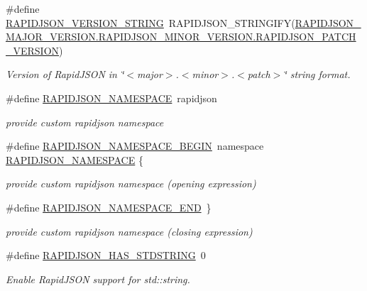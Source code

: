 \begin{DoxyCompactItemize}
\#define \hyperlink{group__RAPIDJSON__CONFIG_gad283cfde97d9a32b7d8e8107b11f70a6}{R\+A\+P\+I\+D\+J\+S\+O\+N\+\_\+\+V\+E\+R\+S\+I\+O\+N\+\_\+\+S\+T\+R\+I\+NG}~R\+A\+P\+I\+D\+J\+S\+O\+N\+\_\+\+S\+T\+R\+I\+N\+G\+I\+FY(\hyperlink{group__RAPIDJSON__CONFIG_gaf967d31be43666ce7f53756d73bd1cdf}{R\+A\+P\+I\+D\+J\+S\+O\+N\+\_\+\+M\+A\+J\+O\+R\+\_\+\+V\+E\+R\+S\+I\+O\+N.\+R\+A\+P\+I\+D\+J\+S\+O\+N\+\_\+\+M\+I\+N\+O\+R\+\_\+\+V\+E\+R\+S\+I\+O\+N.\+R\+A\+P\+I\+D\+J\+S\+O\+N\+\_\+\+P\+A\+T\+C\+H\+\_\+\+V\+E\+R\+S\+I\+ON})
\begin{DoxyCompactList}\small\item\em Version of Rapid\+J\+S\+ON in \char`\"{}$<$major$>$.$<$minor$>$.$<$patch$>$\char`\"{} string format. \end{DoxyCompactList}\item 
\#define \hyperlink{group__RAPIDJSON__CONFIG_ga743a79d3af927391fe3eb5c979136899}{R\+A\+P\+I\+D\+J\+S\+O\+N\+\_\+\+N\+A\+M\+E\+S\+P\+A\+CE}~rapidjson
\begin{DoxyCompactList}\small\item\em provide custom rapidjson namespace \end{DoxyCompactList}\item 
\#define \hyperlink{group__RAPIDJSON__CONFIG_gad3806c8251fdc7da9618b7e922674ffc}{R\+A\+P\+I\+D\+J\+S\+O\+N\+\_\+\+N\+A\+M\+E\+S\+P\+A\+C\+E\+\_\+\+B\+E\+G\+IN}~namespace \hyperlink{group__RAPIDJSON__CONFIG_ga743a79d3af927391fe3eb5c979136899}{R\+A\+P\+I\+D\+J\+S\+O\+N\+\_\+\+N\+A\+M\+E\+S\+P\+A\+CE} \{
\begin{DoxyCompactList}\small\item\em provide custom rapidjson namespace (opening expression) \end{DoxyCompactList}\item 
\#define \hyperlink{group__RAPIDJSON__CONFIG_gaf18f052a98b9f5df5448d39484b743c1}{R\+A\+P\+I\+D\+J\+S\+O\+N\+\_\+\+N\+A\+M\+E\+S\+P\+A\+C\+E\+\_\+\+E\+ND}~\}
\begin{DoxyCompactList}\small\item\em provide custom rapidjson namespace (closing expression) \end{DoxyCompactList}\item 
\#define \hyperlink{group__RAPIDJSON__CONFIG_ga2f2eef0ee4477f3fe5874703a66e997f}{R\+A\+P\+I\+D\+J\+S\+O\+N\+\_\+\+H\+A\+S\+\_\+\+S\+T\+D\+S\+T\+R\+I\+NG}~0
\begin{DoxyCompactList}\small\item\em Enable Rapid\+J\+S\+ON support for {\ttfamily std\+::string}. \end{DoxyCompactList}\item 

\end{DoxyCompactItemize}
